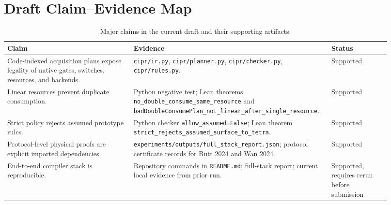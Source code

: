 \section{Draft Claim--Evidence Map}

\begin{table}[h]
\centering
\caption{Major claims in the current draft and their supporting artifacts.}
\begin{tabular}{p{0.32\linewidth}p{0.45\linewidth}p{0.15\linewidth}}
\toprule
Claim & Evidence & Status \\
\midrule
Code-indexed acquisition plans expose legality of native gates, switches, resources, and backends.
& \texttt{cipr/ir.py}, \texttt{cipr/planner.py}, \texttt{cipr/checker.py}, \texttt{cipr/rules.py}. & Supported \\
Linear resources prevent duplicate consumption.
& Python negative test; Lean theorems \texttt{no\_double\_consume\_same\_resource} and \texttt{badDoubleConsumePlan\_not\_linear\_after\_single\_resource}. & Supported \\
Strict policy rejects assumed prototype rules.
& Python checker \texttt{allow\_assumed=False}; Lean theorem \texttt{strict\_rejects\_assumed\_surface\_to\_tetra}. & Supported \\
Protocol-level physical proofs are explicit imported dependencies.
& \texttt{experiments/outputs/full\_stack\_report.json}; protocol certificate records for Butt 2024 and Wan 2024. & Supported \\
End-to-end compiler stack is reproducible.
& Repository commands in \texttt{README.md}; full-stack report; current local evidence from prior run. & Supported, requires rerun before submission \\
\bottomrule
\end{tabular}
\end{table}
